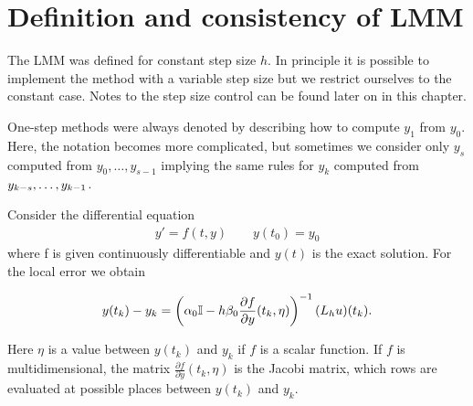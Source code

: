 \section{Definition and consistency of LMM}



\begin{remark}
   The LMM was defined for constant step size
  $h$.  In principle it is possible to implement the method with a
  variable step size but we restrict ourselves to the constant case.
  Notes to the step size control can be found later on in this chapter.
\end{remark}

\begin{remark}
  One-step methods were always denoted by describing how to compute
  $y_1$ from $y_0$. Here, the notation becomes more complicated, but
  sometimes we consider only $y_s$ computed from $y_0,\dots,y_{s-1}$
  implying the same rules for $y_k$ computed from
  $y_{k-s},\dots,y_{k-1}$.
\end{remark}


\begin{lemma}
  Consider the differential equation
  \begin{gather*}
    y' = f(t,y) \qquad y(t_0) = y_0
  \end{gather*}
  where f is given continuously differentiable and $y(t)$ is the exact solution.
  For the local error we obtain

  \begin{gather}
    y(t_k)-y_k = \left( \alpha_0 \mathbb I - h\beta_0 \frac{\partial f}{\partial y}(t_k,\eta) \right)^{-1} (L_h u)(t_k).
  \end{gather}

  Here $\eta$ is a value between $y(t_k)$ and $y_k$ if $f$ is a scalar
	function.
  If $f$ is multidimensional, the matrix 
	$\frac{\partial f}{\partial y}(t_k,\eta)$ is the Jacobi matrix, 
	which rows are evaluated at possible places between
	$y(t_k)$ and $y_k$.
\end{lemma}

